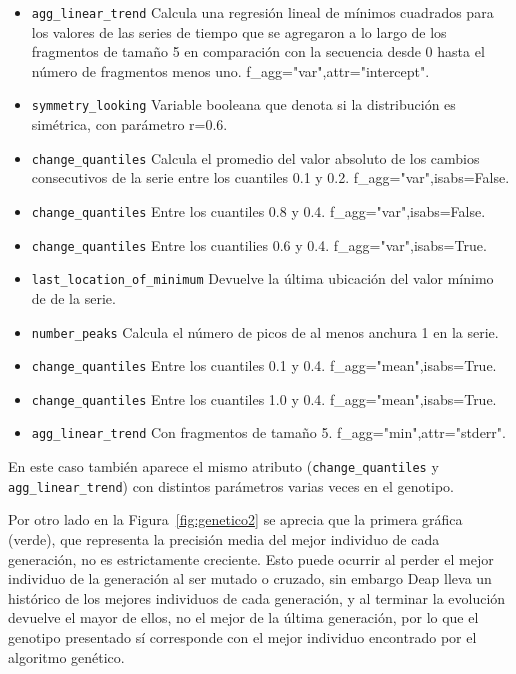 \documentclass[a4paper,12pt,twoside,oldfontcommands]{memoir}
\begin{document}
	\begin{itemize}
		
		\item \texttt{agg\_linear\_trend} Calcula una regresión lineal de mínimos cuadrados para los valores de las series de tiempo que se agregaron a lo largo de los fragmentos de tamaño 5 en comparación con la secuencia desde 0 hasta el número de fragmentos menos uno. f\_agg="var",attr="intercept".
		\item \texttt{symmetry\_looking} Variable booleana que denota si la distribución es simétrica, con parámetro r=0.6.
		\item \texttt{change\_quantiles} Calcula el promedio del valor absoluto de los cambios consecutivos de la serie entre los cuantiles 0.1 y 0.2. f\_agg="var",isabs=False.
		\item \texttt{change\_quantiles} Entre los cuantiles 0.8 y 0.4. f\_agg="var",isabs=False.
		\item \texttt{change\_quantiles} Entre los cuantilies 0.6 y 0.4. f\_agg="var",isabs=True.
		\item \texttt{last\_location\_of\_minimum} Devuelve la última ubicación del valor mínimo de de la serie.
		\item \texttt{number\_peaks} Calcula el número de picos de al menos anchura 1 en la serie.
		\item \texttt{change\_quantiles} Entre los cuantiles 0.1 y 0.4. f\_agg="mean",isabs=True.
		\item \texttt{change\_quantiles} Entre los cuantiles 1.0 y 0.4. f\_agg="mean",isabs=True.
		\item \texttt{agg\_linear\_trend} Con fragmentos de tamaño 5. f\_agg="min",attr="stderr".
	\end{itemize}
	
	En este caso también aparece el mismo atributo (\texttt{change\_quantiles} y \texttt{agg\_linear\_trend}) con distintos parámetros varias veces en el genotipo. 
	
	Por otro lado en la Figura~\ref{fig:genetico2} se aprecia que la primera gráfica (verde), que representa la precisión media del mejor individuo de cada generación, no es estrictamente creciente. Esto puede ocurrir al perder el mejor individuo de la generación al ser mutado o cruzado, sin embargo Deap lleva un histórico de los mejores individuos de cada generación, y al terminar la evolución devuelve el mayor de ellos, no el mejor de la última generación, por lo que el genotipo presentado sí corresponde con el mejor individuo encontrado por el algoritmo genético. 
	
\end{document}
